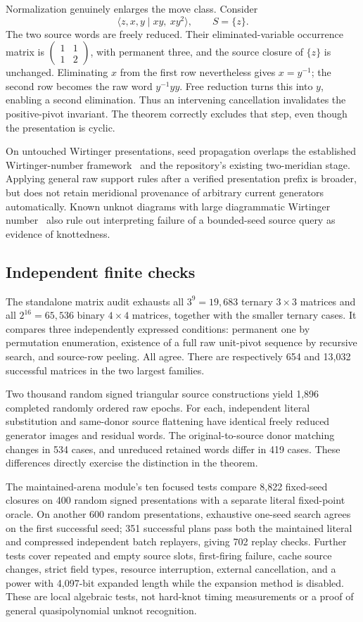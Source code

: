 Normalization genuinely enlarges the move class. Consider
\[
 \langle z,x,y\mid xy,\ xy^2\rangle,
 \qquad S=\{z\}.
\]
The two source words are freely reduced. Their eliminated-variable
occurrence matrix is
$\left(\begin{smallmatrix}1&1\\1&2\end{smallmatrix}\right)$, with
permanent three, and the source closure of $\{z\}$ is unchanged.
Eliminating $x$ from the first row nevertheless gives $x=y^{-1}$; the
second row becomes the raw word $y^{-1}yy$. Free reduction turns this into
$y$, enabling a second elimination. Thus an intervening cancellation
invalidates the positive-pivot invariant. The theorem correctly excludes
that step, even though the presentation is cyclic.

On untouched Wirtinger presentations, seed propagation overlaps the
established Wirtinger-number framework~\cite{wirtinger} and the repository's existing
two-meridian stage. Applying general raw support rules after a verified
presentation prefix is broader, but does not retain meridional provenance
of arbitrary current generators automatically. Known unknot diagrams with
large diagrammatic Wirtinger number~\cite{incompatibility} also rule out interpreting failure of
a bounded-seed source query as evidence of knottedness.

\subsection{Independent finite checks}

The standalone matrix audit exhausts all $3^9=19{,}683$ ternary $3\times3$
matrices and all $2^{16}=65{,}536$ binary $4\times4$ matrices, together with
the smaller ternary cases. It compares three independently expressed
conditions: permanent one by permutation enumeration, existence of a full
raw unit-pivot sequence by recursive search, and source-row peeling.
All agree. There are respectively 654 and 13,032 successful matrices in
the two largest families.

Two thousand random signed triangular source constructions yield 1,896
completed randomly ordered raw epochs. For each, independent literal
substitution and same-donor source flattening have identical freely reduced
generator images and residual words. The original-to-source donor matching
changes in 534 cases, and unreduced retained words differ in 419 cases.
These differences directly exercise the distinction in the theorem.

The maintained-arena module's ten focused tests compare 8,822 fixed-seed
closures on 400 random signed presentations with a separate literal
fixed-point oracle. On another 600 random presentations, exhaustive
one-seed search agrees on the first successful seed; 351 successful plans
pass both the maintained literal and compressed independent batch replayers,
giving 702 replay checks. Further tests cover repeated and empty source
slots, first-firing failure, cache source changes, strict field types,
resource interruption, external cancellation, and a power with 4,097-bit
expanded length while the expansion method is disabled. These are local
algebraic tests, not hard-knot timing measurements or a proof of general
quasipolynomial unknot recognition.
